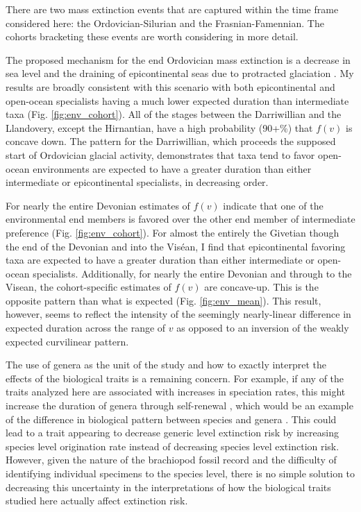 \documentclass{article}
\begin{document}
There are two mass extinction events that are captured within the time frame considered here: the Ordovician-Silurian and the Frasnian-Famennian. The cohorts bracketing these events are worth considering in more detail.


The proposed mechanism for the end Ordovician mass extinction is a decrease in sea level and the draining of epicontinental seas due to protracted glaciation \citep{Sheehan2001b,Johnson1974}. My results are broadly consistent with this scenario with both epicontinental and open-ocean specialists having a much lower expected duration than intermediate taxa (Fig. \ref{fig:env_cohort}). All of the stages between the Darriwillian and the Llandovery, except the Hirnantian, have a high probability (90+\%) that \(f(v)\) is concave down. The pattern for the Darriwillian, which proceeds the supposed start of Ordovician glacial activity, demonstrates that taxa tend to favor open-ocean environments are expected to have a greater duration than either intermediate or epicontinental specialists, in decreasing order.

For nearly the entire Devonian estimates of \(f(v)\) indicate that one of the environmental end members is favored over the other end member of intermediate preference (Fig. \ref{fig:env_cohort}). For almost the entirely the Givetian though the end of the Devonian and into the Vis\'{e}an, I find that epicontinental favoring taxa are expected to have a greater duration than either intermediate or open-ocean specialists. Additionally, for nearly the entire Devonian and through to the Visean, the cohort-specific estimates of \(f(v)\) are concave-up. This is the opposite pattern than what is expected (Fig. \ref{fig:env_mean}). This result, however, seems to reflect the intensity of the seemingly nearly-linear difference in expected duration across the range of \(v\) as opposed to an inversion of the weakly expected curvilinear pattern.

The use of genera as the unit of the study and how to exactly interpret the effects of the biological traits is a remaining concern. For example, if any of the traits analyzed here are associated with increases in speciation rates, this might increase the duration of genera through self-renewal \citep{Raup1991b,Raup1994}, which would be an example of the difference in biological pattern between species and genera \citep{Jablonski1987,Jablonski2007,Jablonski2008a}. This could lead to a trait appearing to decrease generic level extinction risk by increasing species level origination rate instead of decreasing species level extinction risk. However, given the nature of the brachiopod fossil record and the difficulty of identifying individual specimens to the species level, there is no simple solution to decreasing this uncertainty in the interpretations of how the biological traits studied here actually affect extinction risk.
\end{document}
